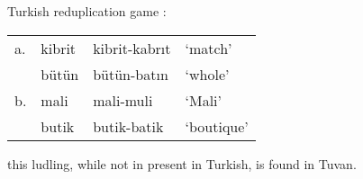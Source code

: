 
\ex Turkish reduplication game \citep[][231]{Harrison2001}: \\
\begin{tabular}{l l l l}
a. & kibrit & kibrit-kabrıt & `match'    \\
   & bütün  & bütün-batın   & `whole'    \\
b. & mali   & mali-muli     & `Mali'     \\
   & butik  & butik-batik   & `boutique' \\
\end{tabular} \xe


this ludling, while not in present in Turkish, is found in Tuvan.
